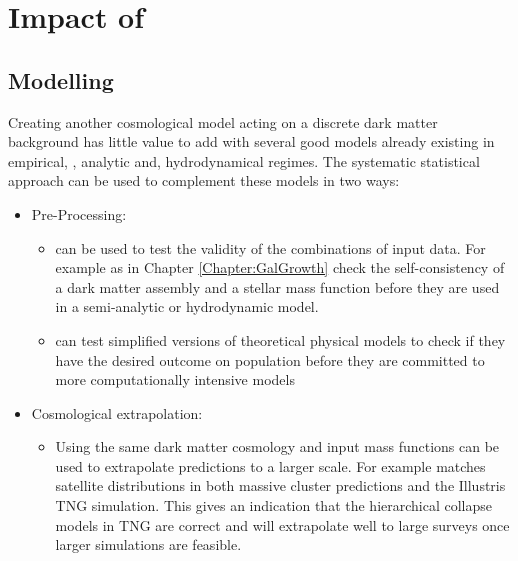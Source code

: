 \section{Impact of \steel}

\subsection{Modelling}

Creating another cosmological model acting on a discrete dark matter background has little value to add with several good models already existing in empirical, \cite[e.g.][]{Rodriguez-Puebla2017ConstrainingProperties, Moster2018Emerge10, Behroozi2019UniverseMachine:010, Zavala2012}, analytic \cite[e.g.][]{Somerville2015StarGas, Guo2011FromCosmology, Fontanot2007ReproducingCosmogony, Zoldan2019TheEvolution} and, hydrodynamical \cite{Springel2018FirstClustering, Hopkins2018FIRE-2Formation, McAlpine2015TheCatalogues} regimes. The systematic statistical approach can be used to complement these models in two ways:
\begin{itemize}
    \item Pre-Processing: 
    \begin{itemize}
        \item \steel can be used to test the validity of the combinations of input data. For example as in Chapter \ref{Chapter:GalGrowth} check the self-consistency of a dark matter assembly and a stellar mass function before they are used in a semi-analytic or hydrodynamic model.
        \item \steel can test simplified versions of theoretical physical models to check if they have the desired outcome on population before they are committed to more computationally intensive models
    \end{itemize}
    \item Cosmological extrapolation: 
    \begin{itemize}
        \item Using the same dark matter cosmology and input mass functions \steel can be used to extrapolate predictions to a larger scale. For example \steel matches satellite distributions in both massive cluster predictions and the Illustris TNG simulation. This gives an indication that the hierarchical collapse models in TNG are correct and will extrapolate well to large surveys once larger simulations are feasible.
    \end{itemize}
\end{itemize}
